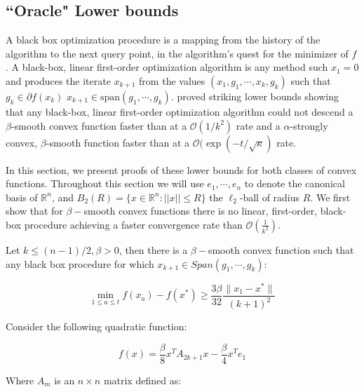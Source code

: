 \subsection{``Oracle" Lower bounds}

A black box optimization procedure is a mapping from the history of the algorithm to the next query point, in the algorithm's quest for the minimizer of $f$. A black-box, linear first-order optimization algorithm is any method such $x_1 = 0$ and produces the iterate $x_{k+1}$ from the values $(x_1, g_1, \cdots, x_k, g_k)$ such that $g_k \in \partial f(x_k)$ $x_{k+1} \in \text{span}(g_1, \cdots, g_k)$.  \cite{nesterov2004introductory} proved striking lower bounds showing that any black-box, linear first-order optimization algorithm could not descend a $\beta$-smooth convex function faster than at a  $\mathcal{O}(1/k^2)$ rate and a $\alpha$-strongly convex, $\beta$-smooth function faster than at a  $\mathcal{O}(\exp(-t/\sqrt{\kappa})$ rate.

In this section, we present proofs of these lower bounds for both classes of convex functions. Throughout this section we will use $e_1, \cdots, e_n$ to denote the canonical basis of $\mathbb{R}^n$, and $B_2(R) = \{ x \in \mathbb{R}^n : ||x|| \leq R\}$ the $\ell_2$-ball of radius $R$. We first show that for $\beta-$smooth convex functions there is no linear, first-order, black-box procedure achieving a faster convergence rate than $\mathcal{O}(\frac{1}{k^2})$. 

\begin{theorem}
Let $k \leq (n-1)/2 , \beta >0$, then there is a $\beta-$smooth convex function such that any black box procedure for which $x_{k+1} \in Span(g_1, \cdots, g_k)$: 

\begin{equation}
\min_{1 \leq a \leq t } f(x_a ) - f(x^*) \geq \frac{3\beta}{32} \frac{\parallel x_1 - x^*\parallel}{(k+1)^2}
\end{equation}

\end{theorem}




\proofstart


Consider the following quadratic function:

\begin{equation}
    f(x) = \frac{\beta}{8}x^T A_{2k+1}x- \frac{\beta}{4}x^Te_1
\end{equation}


Where $A_m$ is an $n\times n$ matrix defined as:

